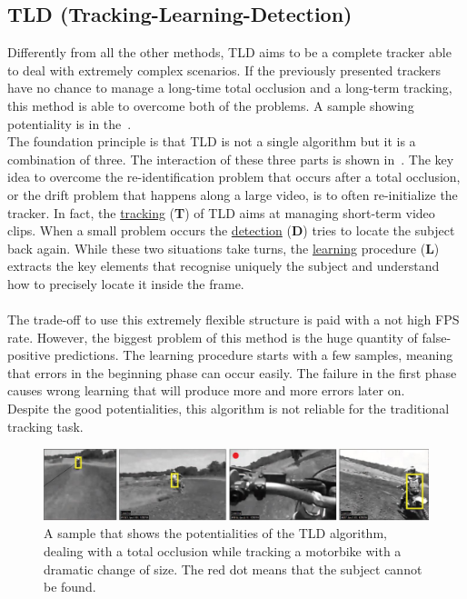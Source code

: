 \subsection{TLD (Tracking-Learning-Detection)}
Differently from all the other methods, TLD\cite{tld} aims to be a complete tracker able to deal with extremely complex scenarios. If the previously presented trackers have no chance to manage a long-time total occlusion and a long-term tracking, this method is able to overcome both of the problems. A sample showing potentiality is in the~.\\
The foundation principle is that TLD is not a single algorithm but it is a combination of three. The interaction of these three parts is shown in~. The key idea to overcome the re-identification problem that occurs after a total occlusion, or the drift problem that happens along a large video, is to often re-initialize the tracker. In fact, the \underline{tracking} (\textbf{T}) of TLD aims at managing short-term video clips. When a small problem occurs the \underline{detection} (\textbf{D}) tries to locate the subject back again. While these two situations take turns, the \underline{learning} procedure (\textbf{L}) extracts the key elements that recognise uniquely the subject and understand how to precisely locate it inside the frame.\\
\\
The trade-off to use this extremely flexible structure is paid with a not high FPS rate. However, the biggest problem of this method is the huge quantity of false-positive predictions. The learning procedure starts with a few samples, meaning that errors in the beginning phase can occur easily. The failure in the first phase causes wrong learning that will produce more and more errors later on.\\
Despite the good potentialities, this algorithm is not reliable for the traditional tracking task.
\begin{figure}[!h]
	\centering
	\includegraphics[width=1\linewidth]{images/tracking/sample_TLD}
	\captionsetup{margin=0.5cm}
	\caption[TLD algorithm applied on a total occlusion video clip.]{A sample that shows the potentialities of the TLD algorithm, dealing with a total occlusion while tracking a motorbike with a dramatic change of size. The red dot means that the subject cannot be found.}
	\label{fig:sample_TLD}
\end{figure}



